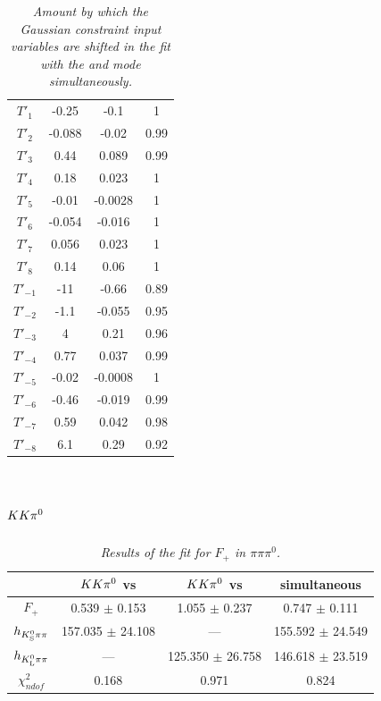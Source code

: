 \begin{table}[!h]
\begin{center}
\begin{tabular}{c| c| c|c}
$T'_1$ & -0.25 & -0.1 & 1\\ 
$T'_2$ & -0.088 & -0.02 & 0.99\\ 
$T'_3$ & 0.44 & 0.089 & 0.99\\ 
$T'_4$ & 0.18 & 0.023 & 1\\ 
$T'_5$ & -0.01 & -0.0028 & 1\\ 
$T'_6$ & -0.054 & -0.016 & 1\\ 
$T'_7$ & 0.056 & 0.023 & 1\\ 
$T'_8$ & 0.14 & 0.06 & 1\\ 
$T'_{-1}$ & -11 & -0.66 & 0.89\\ 
$T'_{-2}$ & -1.1 & -0.055 & 0.95\\ 
$T'_{-3}$ & 4 & 0.21 & 0.96\\ 
$T'_{-4}$ & 0.77 & 0.037 & 0.99\\ 
$T'_{-5}$ & -0.02 & -0.0008 & 1\\ 
$T'_{-6}$ & -0.46 & -0.019 & 0.99\\ 
$T'_{-7}$ & 0.59 & 0.042 & 0.98\\ 
$T'_{-8}$ & 6.1 & 0.29 & 0.92\\ 
\end{tabular}
\end{center}
\caption{\textit{Amount by which the Gaussian constraint input variables are shifted in the fit with the \KsPiPi and \KlPiPi mode simultaneously.}}
\end{table} 

\clearpage

\section{$K K \pi^0$}
\begin{table}[!h]
	\begin{center}
		\begin{tabular}{c| c|c|c}
			 & $K K \pi^0$ vs \KsPiPi & $K K \pi^0$ vs \KlPiPi & simultaneous \\
			\hline
			\hline
			$F_+$ &  0.539 $\pm$ 0.153 & 1.055 $\pm$ 0.237 &  0.747 $\pm$ 0.111 \\
			$h_{{K^0_{\rm\scriptscriptstyle S}}{\pi}\pi}$ & 157.035 $\pm$ 24.108 & --- &   155.592 $\pm$ 24.549 \\
			$h_{{K^0_{\rm\scriptscriptstyle L}}{\pi}\pi}$ & --- & 125.350 $\pm$ 26.758 &  146.618 $\pm$ 23.519 \\
			$\chi^2_{ndof}$ & 0.168 & 0.971 &  0.824 \\
\end{tabular}
\end{center}
\caption{\textit{Results of the fit for $F_+$ in $\pi \pi \pi^0$.}}
\end{table}

